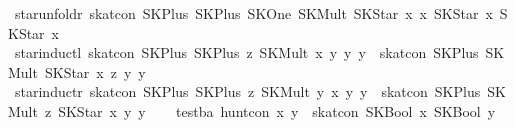 \begin{isabellebody}
{}\ star{}unfoldr{}\ {}skat{}con\ {}SKPlus\ {}SKPlus\ SKOne\ {}SKMult\ {}SKStar\ x{}\ x{}{}\ {}SKStar\ x{}{}\ {}SKStar\ x{}{}\isanewline
{}\ star{}inductl{}\ {}skat{}con\ {}SKPlus\ {}SKPlus\ z\ {}SKMult\ x\ y{}{}\ y{}\ y\ {}\ skat{}con\ {}SKPlus\ {}SKMult\ {}SKStar\ x{}\ z{}\ y{}\ y{}\isanewline
{}\ star{}inductr{}\ {}skat{}con\ {}SKPlus\ {}SKPlus\ z\ {}SKMult\ y\ x{}{}\ y{}\ y\ {}\ skat{}con\ {}SKPlus\ {}SKMult\ z\ {}SKStar\ x{}{}\ y{}\ y{}\isanewline
\isanewline
\ \ \isanewline
{}\ test{}ba{}\ {}hunt{}con\ x\ y\ {}\ skat{}con\ {}SKBool\ x{}\ {}SKBool\ y{}{}\isanewline

\end{isabellebody}
